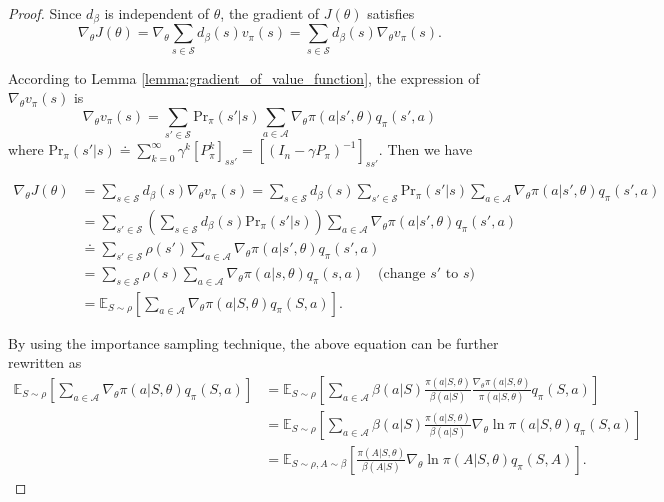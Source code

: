 \documentclass[10pt]{elegantbook}
\begin{document}
\begin{proof}
    Since $d_{\beta}$ is independent of $\theta$, the gradient of $J(\theta)$ satisfies
    \begin{equation}
    \nabla_{\theta} J(\theta) = \nabla_{\theta} \sum_{s \in \mathcal{S}} d_{\beta}(s) v_{\pi}(s) = \sum_{s \in \mathcal{S}} d_{\beta}(s) \nabla_{\theta} v_{\pi}(s).
    \end{equation}

    According to Lemma \ref{lemma:gradient_of_value_function}, the expression of $\nabla_{\theta} v_{\pi}(s)$ is
    \begin{equation}
    \nabla_{\theta} v_{\pi}(s) = \sum_{s' \in \mathcal{S}} \text{Pr}_{\pi}(s'|s) \sum_{a \in \mathcal{A}} \nabla_{\theta} \pi(a|s', \theta) q_{\pi}(s', a)
    \end{equation}
    where $\text{Pr}_{\pi}(s'|s) \doteq \sum_{k=0}^{\infty} \gamma^k [P_{\pi}^k]_{ss'} = [(I_n - \gamma P_{\pi})^{-1}]_{ss'}$. Then we have

    \begin{align*}
    \nabla_{\theta} J(\theta) 
    &= \sum_{s \in \mathcal{S}} d_{\beta}(s) \nabla_{\theta} v_{\pi}(s) 
    = \sum_{s \in \mathcal{S}} d_{\beta}(s) \sum_{s' \in \mathcal{S}} \text{Pr}_{\pi}(s'|s) \sum_{a \in \mathcal{A}} \nabla_{\theta} \pi(a|s', \theta) q_{\pi}(s', a) \\
    &= \sum_{s' \in \mathcal{S}} \left( \sum_{s \in \mathcal{S}} d_{\beta}(s) \text{Pr}_{\pi}(s'|s) \right) \sum_{a \in \mathcal{A}} \nabla_{\theta} \pi(a|s', \theta) q_{\pi}(s', a) \\
    &\doteq \sum_{s' \in \mathcal{S}} \rho(s') \sum_{a \in \mathcal{A}} \nabla_{\theta} \pi(a|s', \theta) q_{\pi}(s', a) \\
    &= \sum_{s \in \mathcal{S}} \rho(s) \sum_{a \in \mathcal{A}} \nabla_{\theta} \pi(a|s, \theta) q_{\pi}(s, a) \quad \text{(change } s' \text{ to } s) \\
    &= \mathbb{E}_{S \sim \rho} \left[ \sum_{a \in \mathcal{A}} \nabla_{\theta} \pi(a|S, \theta) q_{\pi}(S, a) \right].
    \end{align*}

    By using the importance sampling technique, the above equation can be further rewritten as
    \begin{align*}
    \mathbb{E}_{S \sim \rho} \left[ \sum_{a \in \mathcal{A}} \nabla_{\theta} \pi(a|S, \theta) q_{\pi}(S, a) \right]
    &= \mathbb{E}_{S \sim \rho} \left[ \sum_{a \in \mathcal{A}} \beta(a|S) \frac{\pi(a|S, \theta)}{\beta(a|S)} \frac{\nabla_{\theta} \pi(a|S, \theta)}{\pi(a|S, \theta)} q_{\pi}(S, a) \right] \\
    &= \mathbb{E}_{S \sim \rho} \left[ \sum_{a \in \mathcal{A}} \beta(a|S) \frac{\pi(a|S, \theta)}{\beta(a|S)} \nabla_{\theta} \ln \pi(a|S, \theta) q_{\pi}(S, a) \right] \\
    &= \mathbb{E}_{S \sim \rho, A \sim \beta} \left[ \frac{\pi(A|S, \theta)}{\beta(A|S)} \nabla_{\theta} \ln \pi(A|S, \theta) q_{\pi}(S, A) \right].
    \end{align*}
\end{proof}
\end{document}
